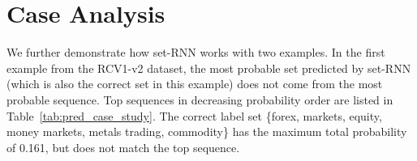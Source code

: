 \section{Case Analysis}
We further demonstrate how set-RNN works with two examples.
In the first example from the RCV1-v2 dataset, the most probable set predicted by set-RNN (which is also the correct set in this example)  does not come from the most probable sequence. Top sequences in decreasing probability order are listed in Table~\ref{tab:pred_case_study}. The correct label set \{forex, markets, equity, money markets, metals trading, commodity\} has the maximum total probability of 0.161, but does not match the top sequence.


